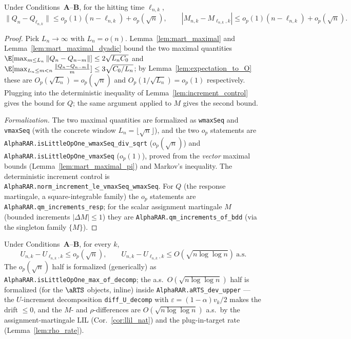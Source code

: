 \begin{lemma}\label{lem:QM_increments}
\leanok
{}
Under Conditions~\textbf{A}--\textbf{B}, for the hitting time $\ell_{n,k}$,
\[
  \|Q_n - Q_{\ell_{n,k}}\| \le o_p(1)(n-\ell_{n,k}) + o_p(\sqrt n),
  \qquad
  |M_{n,k} - M_{\ell_{n,k},k}| \le o_p(1)(n-\ell_{n,k}) + o_p(\sqrt n).
\]
\end{lemma}

\begin{proof}\leanok
{}
Pick $L_n\to\infty$ with $L_n = o(n)$. Lemma~\ref{lem:mart_maximal} and
Lemma~\ref{lem:mart_maximal_dyadic} bound the two maximal quantities
$\E[\max_{m\le L_n}\|Q_n-Q_{n-m}\|]\le 2\sqrt{L_n C_0}$ and
$\E[\max_{L_n\le m<n}\frac{\|Q_n-Q_{n-m}\|}{m}]\le 3\sqrt{C_0/L_n}$; by
Lemma~\ref{lem:expectation_to_O} these are $O_p(\sqrt{L_n})=o_p(\sqrt n)$ and
$O_p(1/\sqrt{L_n})=o_p(1)$ respectively. Plugging into the deterministic
inequality of Lemma~\ref{lem:increment_control} gives the bound for $Q$; the same
argument applied to $M$ gives the second bound.

\emph{Formalization.} The two maximal quantities are formalized as \texttt{wmaxSeq} and
\texttt{vmaxSeq} (with the concrete window $L_n=\lfloor\sqrt n\rfloor$), and the two $o_p$ statements
are \texttt{AlphaRAR.isLittleOpOne\_wmaxSeq\_div\_sqrt} ($o_p(\sqrt n)$) and
\texttt{AlphaRAR.isLittleOpOne\_vmaxSeq} ($o_p(1)$), proved from the \emph{vector} maximal bounds
(Lemma~\ref{lem:mart_maximal_pi}) and Markov's inequality. The deterministic increment control is
\texttt{AlphaRAR.norm\_increment\_le\_vmaxSeq\_wmaxSeq}. For $Q$ (the response martingale, a
square-integrable family) the $o_p$ statements are \texttt{AlphaRAR.qm\_increments\_resp}; for the
scalar assignment martingale $M$ (bounded increments $|\Delta M|\le1$) they are
\texttt{AlphaRAR.qm\_increments\_of\_bdd} (via the singleton family $\{M\}$).
\end{proof}

\begin{lemma}\label{lem:U_increment_bound}
Under Conditions~\textbf{A}--\textbf{B}, for every $k$,
\[
  U_{n,k} - U_{\ell_{n,k},k} \le o_p(\sqrt n),
  \qquad
  U_{n,k} - U_{\ell_{n,k},k} \le O(\sqrt{n\log\log n})\ \text{a.s.}
\]
The $o_p(\sqrt n)$ half is formalized (generically) as \texttt{AlphaRAR.isLittleOpOne\_max\_of\_decomp};
the a.s.\ $O(\sqrt{n\log\log n})$ half is formalized (for the $\aRTS$ objects, inline) inside
\texttt{AlphaRAR.aRTS\_dev\_upper} --- the $U$-increment decomposition \texttt{diff\_U\_decomp} with
$\varepsilon=(1-\alpha)v_k/2$ makes the drift $\le0$, and the $M$- and $\rho$-differences are
$O(\sqrt{n\log\log n})$ a.s.\ by the assignment-martingale LIL (Cor.~\ref{cor:llil_nat}) and the
plug-in-target rate (Lemma~\ref{lem:rho_rate}).
\end{lemma}

